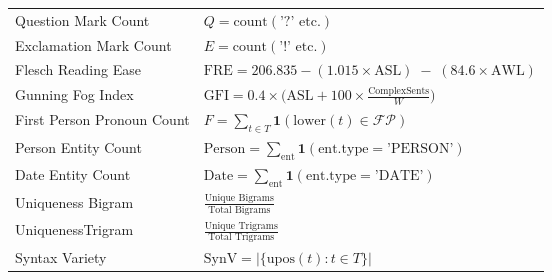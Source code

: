 \documentclass[electronics,article,accept,pdftex,moreauthors,electronics]{Definitions/mdpi}
\begin{document}
\begin{table}[H]
\begin{tabularx}{\linewidth}{l l}
Question Mark Count & $Q = \mathrm{count}(\text{'?' etc.})$ \\
Exclamation Mark Count & $E = \mathrm{count}(\text{'!' etc.})$ \\
Flesch Reading Ease & $\mathrm{FRE} = 206.835 - (1.015 \times \mathrm{ASL}) \;-\; (84.6 \times \mathrm{AWL})$ \\
 Gunning Fog Index & $\mathrm{GFI} = 0.4 \times \bigl(\mathrm{ASL} + 100\times \frac{\mathrm{ComplexSents}}{W}\bigr)$ \\
First Person Pronoun Count & $F = \sum_{t \in T} \mathbf{1}(\mathrm{lower}(t) \in \mathcal{FP})$ \\
Person Entity Count & $\mathrm{Person} = \sum_{\mathrm{ent}} \mathbf{1}(\mathrm{ent.type}=\text{'PERSON'})$ \\
Date Entity Count & $\mathrm{Date} = \sum_{\mathrm{ent}} \mathbf{1}(\mathrm{ent.type}=\text{'DATE'})$ \\
Uniqueness Bigram & $\displaystyle \frac{\text{Unique Bigrams}}{\text{Total Bigrams}}$ \\
UniquenessTrigram & $\displaystyle \frac{\text{Unique Trigrams}}{\text{Total Trigrams}}$ \\
Syntax Variety & $\mathrm{SynV} = |\{\mathrm{upos}(t) : t \in T\}|$ \\
\bottomrule
\end{tabularx}
\end{table}
\end{document}
